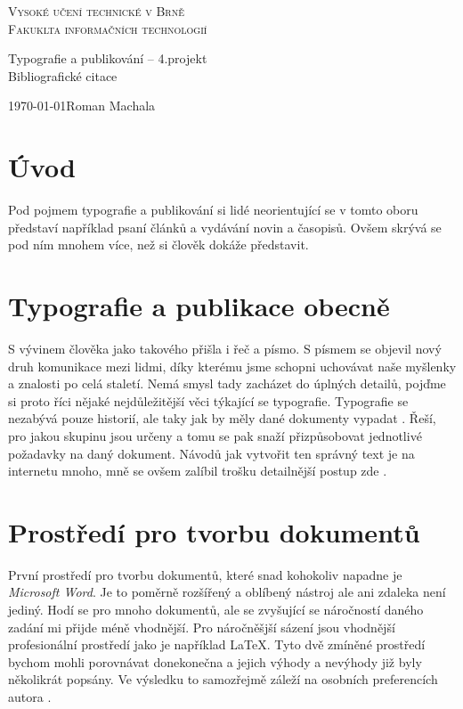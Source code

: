 \documentclass[11pt, a4paper]{article}[14.04.2023]
\begin{document}
    \begin{titlepage}
        \begin{center}
            {\Huge \textsc{Vysoké učení technické v Brně}\\[0.5em]}
            {\huge \textsc{Fakuklta informačních technologií}}

            {\LARGE Typografie a publikování -- 4.projekt\\[0.4em]}
            {\huge Bibliografické citace}

            {\Large \today \hfill Roman Machala}

        \end{center}
    \end{titlepage}

\section{Úvod}


Pod pojmem typografie a publikování si lidé neorientující se v tomto oboru představí například psaní článků a vydávání novin a časopisů.
Ovšem skrývá se pod ním mnohem více, než si člověk dokáže představit.

\section{Typografie a publikace obecně}


S vývinem člověka jako takového přišla i řeč a písmo. S písmem se objevil nový druh komunikace mezi lidmi, díky kterému jsme schopni uchovávat naše myšlenky a znalosti po celá staletí.
Nemá smysl tady zacházet do úplných detailů, pojďme si proto říci nějaké nejdůležitější věci týkající se typografie.
Typografie se nezabývá pouze historií, ale taky jak by měly dané dokumenty vypadat \cite{font}. Řeší, pro jakou skupinu jsou určeny a tomu se pak snaží přizpůsobovat jednotlivé požadavky na daný dokument.
Návodů jak vytvořit ten správný text je na internetu mnoho, mně se ovšem zalíbil trošku detailnější postup zde \cite{rybicka2}.

\section{Prostředí pro tvorbu dokumentů}


První prostředí pro tvorbu dokumentů, které snad kohokoliv napadne je \textit{Microsoft Word}. Je to poměrně rozšířený a oblíbený nástroj ale ani zdaleka není jediný.
Hodí se pro mnoho dokumentů, ale se zvyšující se náročností daného zadání mi přijde méně vhodnější. Pro náročněšjší sázení jsou vhodnější profesionální prostředí jako je například \LaTeX.
Tyto dvě zmíněné prostředí bychom mohli porovnávat donekonečna a jejich výhody a nevýhody již byly několikrát popsány. Ve výsledku to samozřejmě záleží na osobních preferencích autora \cite{baka}.
\end{document}
